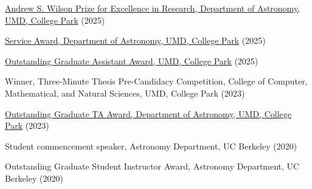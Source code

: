 \item[{\color{numcolor}\scriptsize7}] \href{https://www.astro.umd.edu/resources/internal/awards/dept/service.html}{Andrew S. Wilson Prize for Excellence in Research, Department of Astronomy, UMD, College Park} (2025)

\item[{\color{numcolor}\scriptsize6}] \href{https://www.astro.umd.edu/resources/internal/awards/dept/service.html}{Service Award, Department of Astronomy, UMD, College Park} (2025)


\item[{\color{numcolor}\scriptsize5}] \href{https://gradschool.umd.edu/sites/default/files/2025-05/OGA_AY24-25.pdf}{Outstanding Graduate Assistant Award, UMD, College Park} (2025)


\item[{\color{numcolor}\scriptsize4}] Winner, Three-Minute Thesis Pre-Candidacy Competition, College of Computer, Mathematical, and Natural Sciences, UMD, College Park (2023)


\item[{\color{numcolor}\scriptsize3}] \href{https://www.astro.umd.edu/resources/internal/awards/dept/angerhofer.html}{Outstanding Graduate TA Award, Department of Astronomy, UMD, College Park} (2023)






\item[{\color{numcolor}\scriptsize2}] Student commencement speaker, Astronomy Department, UC Berkeley (2020)

\item[{\color{numcolor}\scriptsize1}] Outstanding Graduate Student Instructor Award, Astronomy Department, UC Berkeley (2020)




